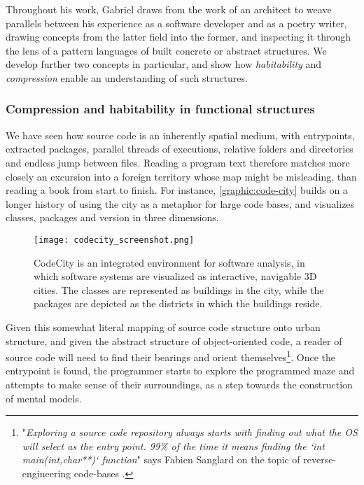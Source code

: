 Throughout his work, Gabriel draws from the work of an architect to weave parallels between his experience as a software developer and as a poetry writer, drawing concepts from the latter field into the former, and inspecting it through the lens of a pattern languages of built concrete or abstract structures. We develop further two concepts in particular, and show how \emph{habitability} and \emph{compression} enable an understanding of such structures.

\subsubsection{Compression and habitability in functional structures}
\label{subsubsec:compression-habitability}

We have seen how source code is an inherently spatial medium, with entrypoints, extracted packages, parallel threads of executions, relative folders and directories and endless jump between files. Reading a program text therefore matches more closely an excursion into a foreign territory whose map might be misleading, than reading a book from start to finish. For instance, \autoref{graphic:code-city} builds on a longer history of using the city as a metaphor for large code bases, and visualizes classes, packages and version in three dimensions.

\begin{figure}
    \texttt{[image: codecity\_screenshot.png]}
    \caption{CodeCity is an integrated environment for software analysis, in which software systems are visualized as interactive, navigable 3D cities. The classes are represented as buildings in the city, while the packages are depicted as the districts in which the buildings reside. \citep{wettel_codecity_2008}}
    \label{graphic:code-city}
\end{figure}

Given this somewhat literal mapping of source code structure onto urban structure, and given the abstract structure of object-oriented code, a reader of source code will need to find their bearings and orient themselves\footnote{"\emph{Exploring a source code repository always starts with finding out what the OS will select as the entry point. 99\% of the time it means finding the `int main(int,char**)` function}" says Fabien Sanglard on the topic of reverse-engineering code-bases \citep{sanglard_game_2018}.}. Once the entrypoint is found, the programmer starts to explore the programmed maze and attempts to make sense of their surroundings, as a step towards the construction of mental models.

